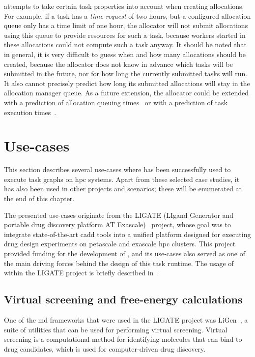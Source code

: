 \Autoalloc{} attempts to take certain task properties into account when creating
allocations. For example, if a task has a \emph{time request} of two hours, but a configured
allocation queue only has a time limit of one hour, the allocator will not submit allocations using
this queue to provide resources for such a task, because workers started in these allocations could
not compute such a task anyway. It should be noted that in general, it is very difficult to guess
when and how many allocations should be created, because the allocator does not know in advance
which tasks will be submitted in the future, nor for how long the currently submitted tasks will
run. It also cannot precisely predict how long its submitted allocations will stay in the
allocation manager queue. As a future extension, the allocator could be extended with a prediction
of allocation queuing times~\cite{allocation-duration-prediction} or with a prediction of task execution
times~\cite{task-duration-prediction}.


\section{Use-cases}
This section describes several use-cases where \hyperqueue{} has been successfully used
to execute task graphs on \gls{hpc} systems. Apart from these selected case studies,
it has also been used in other projects and scenarios; these will be enumerated at the end of this
chapter.

The presented use-cases originate from the LIGATE (LIgand Generator and portable drug discovery
platform AT Exascale)~\cite{ligate} project, whose goal was to integrate state-of-the-art
\gls{cadd} tools into a unified platform designed for executing drug design
experiments on petascale and exascale \gls{hpc} clusters. This project provided
funding for the development of \hyperqueue{}, and its use-cases also served as one of the
main driving forces behind the design of this task runtime. The usage of \hyperqueue{}
within the LIGATE project is briefly described in~\cite{ligate}.

\subsection{Virtual screening and free-energy calculations}
\label{sec:hq-usecase-ligen}
One of the \gls{md} frameworks that were used in the LIGATE project was
LiGen~\cite{ligen,ligen_exscalate}, a suite of utilities that can be used for performing virtual
screening. Virtual screening is a computational method for identifying molecules that can bind to
drug candidates, which is used for computer-driven drug discovery.

